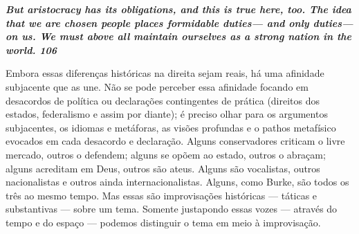  
\par
 

 
\par
 

 \textbf{\textit{But aristocracy has its obligations, and this is true here, too. The idea that we are chosen people places formidable duties— and only duties—on us. We must above all maintain ourselves as a strong nation in the world. {{\color{blue} 106} } } }  
 
 
\par
 
Embora essas diferenças históricas na direita sejam reais, há uma afinidade subjacente que as une. Não se pode perceber essa afinidade focando em desacordos de política ou declarações contingentes de prática (direitos dos estados, federalismo e assim por diante); é preciso olhar para os argumentos subjacentes, os idiomas e metáforas, as visões profundas e o pathos metafísico evocados em cada desacordo e declaração. Alguns conservadores criticam o livre mercado, outros o defendem; alguns se opõem ao estado, outros o abraçam; alguns acreditam em Deus, outros são ateus. Alguns são vocalistas, outros nacionalistas e outros ainda internacionalistas. Alguns, como Burke, são todos os três ao mesmo tempo. Mas essas são improvisações históricas — táticas e substantivas — sobre um tema. Somente justapondo essas vozes — através do tempo e do espaço — podemos distinguir o tema em meio à improvisação.
 
\par
 

